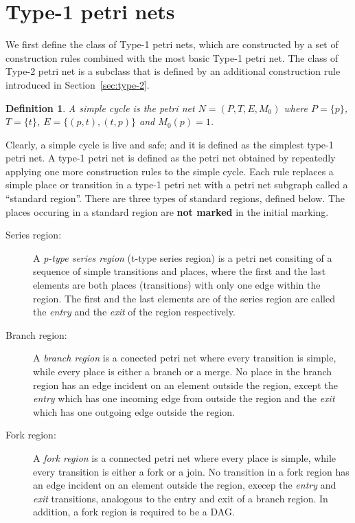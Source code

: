 \documentclass[12pt,a4paper]{article}
\newtheorem{definition}{Definition}
\begin{document}
\section{Type-1 petri nets}
\label{sec:type-1}

We first define the class of Type-1 petri nets, which are constructed
by a set of construction rules combined with the most basic Type-1
petri net. The class of Type-2 petri net is a subclass that is defined
by an additional construction rule introduced in
Section~\ref{sec:type-2}.

\begin{definition}
  A \emph{simple cycle} is the petri net $N = (P, T, E, M_0)$ where $P
  = \{p\}$, $T =\{t\}$, $E = \{(p,t), (t,p)\}$ and $M_0(p) = 1$.
\end{definition}

Clearly, a simple cycle is live and safe; and it is defined as the
simplest type-1 petri net. A type-1 petri net is defined as the petri
net obtained by repeatedly applying one more construction rules to the
simple cycle. Each rule replaces a simple place or transition in a
type-1 petri net with a petri net subgraph called a ``standard
region''. There are three types of standard regions, defined below.
The places occuring in a standard region are \textbf{not marked} in
the initial marking.

\begin{description}
\item [Series region:]
  A \emph{p-type series region} (t-type series region) is a petri net
  consiting of a sequence of simple transitions and places, where the
  first and the last elements are both places (transitions) with only
  one edge within the region. The first and the last elements
  are of the series region are called the \emph{entry} and the
  \emph{exit} of the region respectively.

\item [Branch region:]
  A \emph{branch region} is a conected petri net where every
  transition is simple, while every place is either a branch or a
  merge. No place in the branch region has an edge incident on an
  element outside the region, except the \emph{entry} which has one
  incoming edge from outside the region and the \emph{exit} which has
  one outgoing edge outside the region.

\item [Fork region:]
  A \emph{fork region} is a connected petri net where every place is
  simple, while every transition is either a fork or a join. No
  transition in a fork region has an edge incident on an element
  outside the region, execep the \emph{entry} and \emph{exit}
  transitions, analogous to the entry and exit of a branch region. In
  addition, a fork region is required to be a DAG.
\end{description}
\end{document}
